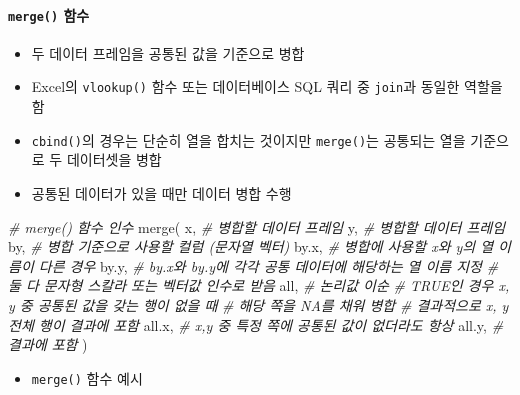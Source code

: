 \documentclass[
  11pt,
]{krantz}
\newenvironment{Shaded}{\begin{snugshade}}{\end{snugshade}}
\newcommand{\CommentTok}[1]{\textcolor[rgb]{0.37,0.37,0.37}{\textit{#1}}}
\newcommand{\FunctionTok}[1]{\textcolor[rgb]{0,0,0}{#1}}
\newcommand{\NormalTok}[1]{#1}
\providecommand{\tightlist}{%
  \setlength{\itemsep}{0pt}\setlength{\parskip}{0pt}}
\begin{document}
\normalsize

\hypertarget{merge}{%
\paragraph*{\texorpdfstring{\texttt{merge()} 함수}{merge() 함수}}\label{merge}}

\begin{itemize}
\tightlist
\item
  두 데이터 프레임을 공통된 값을 기준으로 병합
\item
  Excel의 \texttt{vlookup()} 함수 또는 데이터베이스 SQL 쿼리 중 \texttt{join}과 동일한 역할을 함
\item
  \texttt{cbind()}의 경우는 단순히 열을 합치는 것이지만 \texttt{merge()}는 공통되는 열을 기준으로 두 데이터셋을 병합
\item
  공통된 데이터가 있을 때만 데이터 병합 수행
\end{itemize}

\footnotesize

\begin{Shaded}
\begin{Highlighting}[]
\CommentTok{\# merge() 함수 인수 }
\FunctionTok{merge}\NormalTok{(}
\NormalTok{  x, }\CommentTok{\# 병합할 데이터 프레임}
\NormalTok{  y, }\CommentTok{\# 병합할 데이터 프레임}
\NormalTok{  by, }\CommentTok{\# 병합 기준으로 사용할 컬럼 (문자열 벡터)}
\NormalTok{  by.x, }\CommentTok{\# 병합에 사용할 x와 y의 열 이름이 다른 경우}
\NormalTok{  by.y, }\CommentTok{\# by.x와 by.y에 각각 공통 데이터에 해당하는 열 이름 지정}
        \CommentTok{\# 둘 다 문자형 스칼라 또는 벡터값 인수로 받음}
\NormalTok{  all, }\CommentTok{\# 논리값 이순}
       \CommentTok{\# TRUE인 경우 x, y 중 공통된 값을 갖는 행이 없을 때}
       \CommentTok{\# 해당 쪽을 NA를 채워 병합}
       \CommentTok{\# 결과적으로 x, y 전체 행이 결과에 포함}
\NormalTok{  all.x, }\CommentTok{\# x,y 중 특정 쪽에 공통된 값이 없더라도 항상 }
\NormalTok{  all.y, }\CommentTok{\# 결과에 포함}
\NormalTok{)}
\end{Highlighting}
\end{Shaded}

\normalsize

\begin{itemize}
\tightlist
\item
  \texttt{merge()} 함수 예시
\end{itemize}

\footnotesize
\end{document}
